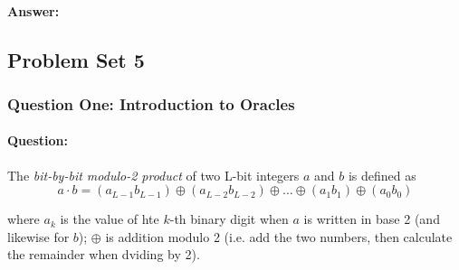 \documentclass[reprint, amsmath,amssymb, aps]{revtex4-2}
\begin{document}
                \begin{mdframed}
                \paragraph{Answer:}

                
                \end{mdframed}

        \subsection{Problem Set 5}
            \subsubsection{Question One: Introduction to Oracles}
                \paragraph{Question:}
                The \textit{bit-by-bit modulo-2 product} of two L-bit integers $a$ and $b$ is defined as 
                \begin{equation*}
                    a\cdot b = (a_{L-1}b_{L-1})\oplus (a_{L-2}b_{L-2})\oplus\dots\oplus(a_1b_1)\oplus(a_0b_0)
                \end{equation*}

                where $a_k$ is the value of hte $k$-th binary digit when $a$ is written in base 2 (and likewise for $b$); $\oplus$ is addition modulo 2 (i.e. add the two numbers, then calculate the remainder when dviding by 2).
\end{document}
